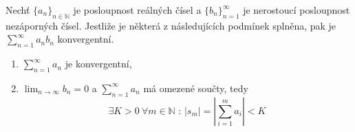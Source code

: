 \begin{vetabd}
Nechť $\{a_n\}_{n \in \mathbb{N}}$ je posloupnost reálných čísel a $\{b_n\}_{n=1}^{\infty}$ je nerostoucí posloupnost nezáporných čísel. Jestliže je některá z následujících podmínek splněna, pak je $\sum_{n=1}^{\infty} a_n b_n$ konvergentní.
\begin{enumerate}
\item $\sum_{n=1}^{\infty} a_n$ je konvergentní,
\item $\lim_{n \rightarrow \infty} b_n = 0$ a $\sum_{n=1}^{\infty} a_n$ má omezené součty, tedy
$$\exists K > 0 \ \forall m \in \mathbb{N} \textrm{ : } | s_m | = \left| \sum_{i=1}^{m} a_i \right| < K$$
\end{enumerate}
\end{vetabd}